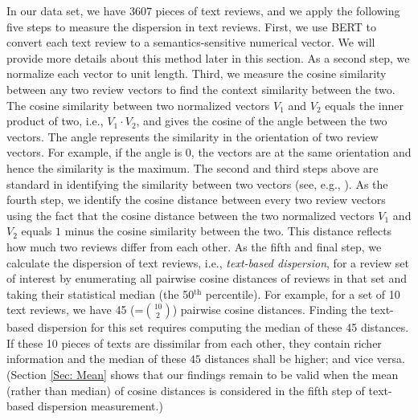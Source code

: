 \documentclass[mnsc,blindrev]{informs3}
\begin{document}
	In our data set, we have $3607$ pieces of text reviews, and we apply the following five steps to measure the dispersion in text reviews. First, we use BERT to convert each text review to a semantics-sensitive numerical vector. We will provide more details about this method later in this section.  As a second step, we normalize each vector to unit length. Third, we measure the cosine similarity between any two review vectors to find the context similarity between the two. The cosine similarity between two normalized vectors $V_{1}$ and $V_{2}$ equals the inner product of two, i.e., $V_1 \cdot V_2$, and gives the cosine of the angle between the two vectors. The angle represents the similarity in the orientation of two review vectors. For example, if the angle is $0$, the vectors are at the same orientation and hence the similarity is the maximum. The second and third steps above are standard in identifying the similarity between two vectors (see, e.g., \cite{hoberg2016text}). As the fourth step, we identify the cosine distance between every two review vectors using the fact that the cosine distance between the two normalized vectors $V_{1}$ and $V_{2}$ equals $1$ minus the cosine similarity between the two. This distance reflects how much two reviews differ from each other. As the fifth and final step, we calculate the dispersion of text reviews, i.e., \emph{text-based dispersion}, for a review set of interest by enumerating all pairwise cosine distances of reviews in that set and taking their statistical median (the 50$^{\text{th}}$ percentile). For example, for a set of 10 text reviews, we have 45 (=$\binom{10}{2}$) pairwise cosine distances. Finding the text-based dispersion for this set requires computing the median of these 45 distances. If these 10 pieces of texts are dissimilar from each other, they contain richer information and the median of these $45$ distances shall be higher; and vice versa. (Section \ref{Sec: Mean} shows that our findings remain to be valid when the mean (rather than median) of cosine distances is considered in the fifth step of text-based dispersion measurement.)
	
\end{document}
